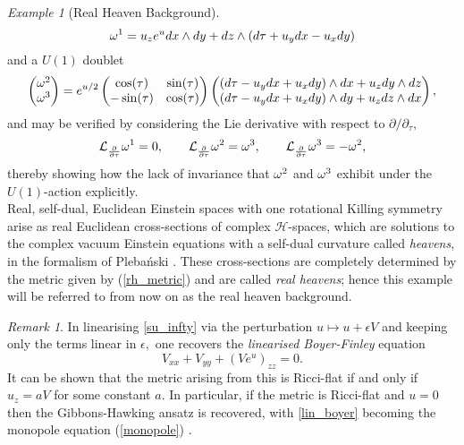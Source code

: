 \documentclass[a4paper,12pt, onecolumn, notitlepage]{article}
\theoremstyle{definition}
\theoremstyle{remark}
\newtheorem{rmk}[thm]{Remark}
\newtheorem{ex}[thm]{Example}
\newcommand{\w}{\omega}
\newcommand{\e}{\epsilon}
\newcommand{\ddt}[1]{\frac{\partial #1}{\partial \tau}}
\begin{document}
\begin{ex}[Real Heaven Background]
	\begin{equation}
	\label{su_k1}
		\w\indices{^1} = u_{z}e^{u}dx\wedge dy + dz \wedge (d\tau + u_{y}dx - u_{x}dy)
	\end{equation}
	and a $U(1)$ doublet \cite{bakas_1995}
	\begin{equation*}
	\label{su_k23}
		\begin{pmatrix}
		\w\indices{^2}\\
		\w\indices{^3}
		\end{pmatrix}
		=
		e^{u/2}
		\begin{pmatrix}
		\cos(\tau) & \sin(\tau) \\
		-\sin(\tau) & \cos(\tau)
		\end{pmatrix}
		\begin{pmatrix}
		(d\tau - u_{y}dx+u_{x}dy)\wedge dx + u_{z}dy\wedge dz\\
		(d\tau - u_{y}dx+u_{x}dy) \wedge dy + u_{z}dz\wedge dx
		\end{pmatrix},
	\end{equation*}
	and may be verified by considering the Lie derivative with respect to $\partial/\partial_{\tau},$
	\begin{equation*}
		\mathcal{L}_{\ddt{}}\w\indices{^1}=0,\qquad \mathcal{L}_{\ddt{}}\w\indices{^2}=\w\indices{^3},\qquad
		\mathcal{L}_{\ddt{}}\w\indices{^3}= -\w\indices{^2},
	\end{equation*}
	thereby showing how the lack of invariance that $\w\indices{^2}$ and $\w\indices{^3}$ exhibit under the $U(1)$-action explicitly.\\
	Real, self-dual, Euclidean Einstein spaces with one rotational Killing symmetry arise as real Euclidean cross-sections of complex $\mathcal{H}$-spaces, which are solutions to the complex vacuum Einstein equations with a self-dual curvature called \emph{heavens}, in the formalism of Pleba\'nski \cite{plebanski_1975,park_1990}. These cross-sections are completely determined by the metric given by (\ref{rh_metric}) and are called \emph{real heavens}; hence this example will be referred to from now on as the real heaven background.\\
\end{ex}

\begin{rmk}
	In linearising \cref{su_infty} via the perturbation $u\mapsto u + \e V$ and keeping only the terms linear in $\e,$ one recovers the \emph{linearised Boyer-Finley} equation
	\begin{equation}
		\label{lin_boyer}
		V_{xx} + V_{yy} + (Ve^{u})_{zz}=0. 
	\end{equation}
	It can be shown that the metric arising from this is Ricci-flat if and only if $u_{z} = aV$ for some constant $a.$ In particular, if the metric is Ricci-flat and $u=0$ then the Gibbons-Hawking ansatz is recovered, with \cref{lin_boyer} becoming the monopole equation (\ref{monopole}) \cite{lebrun_1991}.
\end{rmk}
\end{document}
